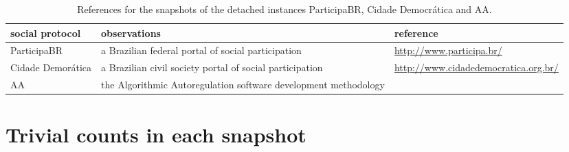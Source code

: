 \begin{apendicesenv}
																																	       \begin{table*}[h!]\scriptsize
																																		       \begin{center}
																																			       \caption{References for the snapshots of the detached instances
																																			       ParticipaBR, Cidade Democrática and AA.}\label{tab:provenance}
																																			       \begin{tabular}{| l || p{4cm} | p{3cm} | }\hline
																																				       \textbf{social protocol} & \textbf{observations} & \textbf{reference} \\\hline\hline
																																					       ParticipaBR & a Brazilian federal portal of social participation & \url{http://www.participa.br/} \\\hline
																																						   Cidade Demorática & a Brazilian civil society portal of social participation & \url{http://www.cidadedemocratica.org.br/} \\\hline
																																						       AA & the Algorithmic Autoregulation software development methodology & \cite{aarticle} \\\hline
																																			       \end{tabular}\end{center}
																																		       \end{table*}                    


																																		       \clearpage
																																		       \section{Trivial counts in each snapshot}
																																		       






																																	       \end{apendicesenv}
